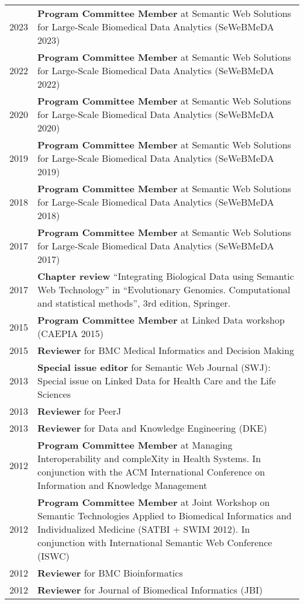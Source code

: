 \documentclass[11pt,fullpage]{article}
\begin{document}
\begin{longtable}{p{0.5in}|p{5.5in}}
2023 & \textbf{Program Committee Member} at Semantic Web Solutions for Large-Scale Biomedical Data Analytics (SeWeBMeDA 2023) \\
2022 & \textbf{Program Committee Member} at Semantic Web Solutions for Large-Scale Biomedical Data Analytics (SeWeBMeDA 2022) \\
2020 & \textbf{Program Committee Member} at Semantic Web Solutions for Large-Scale Biomedical Data Analytics (SeWeBMeDA 2020) \\
2019 & \textbf{Program Committee Member} at Semantic Web Solutions for Large-Scale Biomedical Data Analytics (SeWeBMeDA 2019) \\  
2018 & \textbf{Program Committee Member} at Semantic Web Solutions for Large-Scale Biomedical Data Analytics (SeWeBMeDA 2018) \\
2017 & \textbf{Program Committee Member} at Semantic Web Solutions for Large-Scale Biomedical Data Analytics (SeWeBMeDA 2017) \\
2017 & \textbf{Chapter review} ``Integrating Biological Data using Semantic Web Technology'' in ``Evolutionary Genomics. Computational and statistical methods'', 3rd edition, Springer. \\
2015 & \textbf{Program Committee Member} at Linked Data workshop (CAEPIA 2015) \\
2015  & \textbf{Reviewer} for BMC Medical Informatics and Decision Making \\
2013 & {\bf Special issue editor} for Semantic Web Journal (SWJ): Special issue on Linked Data for Health Care and the Life Sciences \\
2013  & \textbf{Reviewer} for PeerJ \\
2013  & \textbf{Reviewer} for Data and Knowledge Engineering (DKE) \\
2012 & \textbf{Program Committee Member} at Managing Interoperability and compleXity in Health Systems. In conjunction with the ACM International Conference on Information and Knowledge Management\\
2012 & \textbf{Program Committee Member} at Joint Workshop on Semantic Technologies Applied to Biomedical Informatics and Individualized Medicine (SATBI + SWIM 2012). In conjunction with International Semantic Web Conference (ISWC)\\
2012  & \textbf{Reviewer} for BMC Bioinformatics \\
2012  & \textbf{Reviewer} for Journal of Biomedical Informatics (JBI) \\

\end{longtable}
\end{document}
